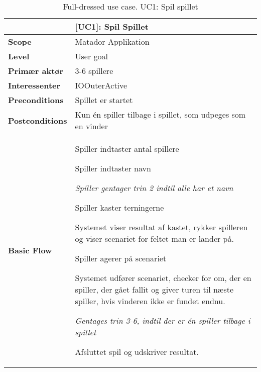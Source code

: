 \documentclass[class=article, crop=false]{standalone}
\makeatletter
\let\savespace\@minipagetrue
\makeatother
\begin{document}
    \begin{table}[H]
        \caption{Full-dressed use case. UC1: Spil spillet}
        \begin{tabularx}{\textwidth}{|l|X|}
            \hline
                                         & \textbf{[UC1]: Spil Spillet}   \\ \hline
            \textbf{Scope}               & Matador Applikation\\ \hline
            \textbf{Level}               & User goal     \\ \hline
            \textbf{Primær aktør}        & 3-6 spillere  \\ \hline
            \textbf{Interessenter}       & IOOuterActive\\ \hline
            \textbf{Preconditions}       & Spillet er startet \\ \hline
            \textbf{Postconditions}      & Kun én spiller tilbage i spillet,
                                           som udpeges som en vinder\\ \hline





            \textbf{Basic Flow} & \begin{tabenum}
                          \item Spiller indtaster antal spillere
                          \item Spiller indtaster navn
                              \savespace
                                \begin{compactitem}
                                    \item \textit{Spiller gentager trin 2                                                             indtil alle har et navn}
                          \end{compactitem}
                              \item Spiller kaster terningerne
                              \item Systemet viser resultat af kastet, rykker spilleren og viser scenariet for feltet man er lander på.
                              \item Spiller agerer på scenariet
                              \item Systemet udfører scenariet, checker for om, der en spiller, der gået fallit og giver turen til næste spiller, hvis vinderen ikke er fundet endnu.
                          \savespace
                          \begin{compactitem}
                              \item \textit{Gentages trin 3-6, indtil der er én spiller tilbage i spillet}
                          \end{compactitem}
                              \item Afsluttet spil og udskriver resultat.
                           \end{tabenum}   \\ \hline





\end{tabularx}
\end{table}
\end{document}
